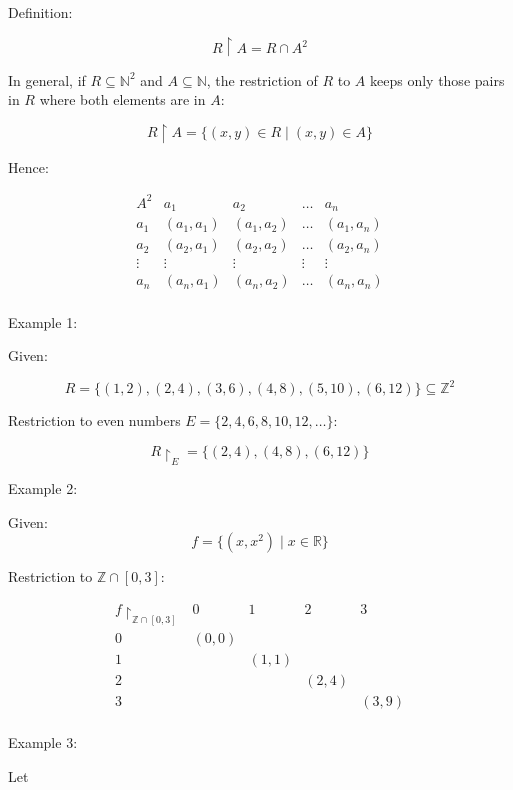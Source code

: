 \documentclass[12pt,a4paper,openany]{article}
\begin{document}
Definition:

$$
R \upharpoonright A = R \cap A^2
$$

In general, if $R \subseteq \mathbb{N}^2$ and $A \subseteq \mathbb{N}$, the restriction of $R$ to $A$ keeps only those pairs in $R$ where both elements are in $A$:

$$
R \upharpoonright A = \{ (x, y) \in R \mid (x,y) \in A \}
$$

Hence:

$$
\begin{array}{c|cccc}
A^2 & a_1 & a_2 & \dots & a_n \\
\hline
a_1 & (a_1,a_1) & (a_1,a_2) & \dots & (a_1,a_n) \\
a_2 & (a_2,a_1) & (a_2,a_2) & \dots & (a_2,a_n) \\
\vdots & \vdots & \vdots & \vdots & \vdots \\
a_n & (a_n,a_1) & (a_n,a_2) & \dots & (a_n,a_n) \\
\end{array}
$$

Example 1:

Given:

$$R = \{(1, 2), (2, 4), (3, 6), (4, 8), (5, 10), (6, 12)\} \subseteq \mathbb{Z}^2$$

Restriction to even numbers $E = \{2, 4, 6, 8, 10, 12, \ldots\}$:

$$R \upharpoonright_E = \{(2, 4), (4, 8), (6, 12)\}$$


Example 2:

Given:
$$f = \{(x, x^2) \mid x \in \mathbb{R}\}$$


Restriction to $\mathbb{Z} \cap [0,3]$:

$$
\begin{array}{c|cccc}
f \upharpoonright_{\mathbb{Z} \cap [0,3]} & 0 & 1 & 2 & 3 \\
\hline
0 & (0,0) & & & \\
1 & & (1,1) & & \\
2 & & & (2,4) & \\
3 & & & & (3,9) \\
\end{array}
$$

Example 3:

Let
\end{document}
